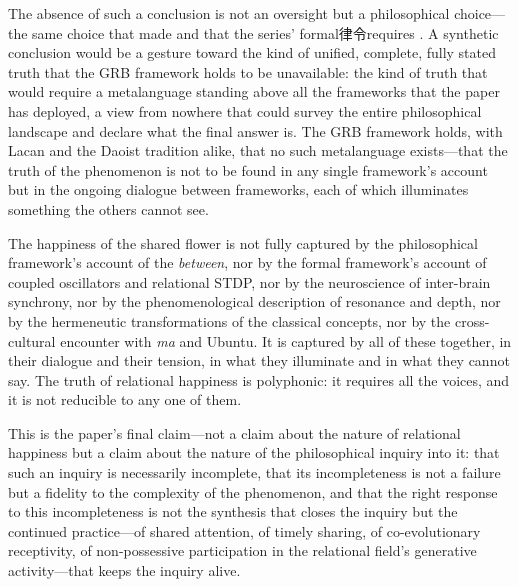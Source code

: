 The absence of such a conclusion is not an oversight but a philosophical choice---the same choice that  made and that the series' formal律令requires \parencite{paperix}. A synthetic conclusion would be a gesture toward the kind of unified, complete, fully stated truth that the GRB framework holds to be unavailable: the kind of truth that would require a metalanguage standing above all the frameworks that the paper has deployed, a view from nowhere that could survey the entire philosophical landscape and declare what the final answer is. The GRB framework holds, with Lacan and the Daoist tradition alike, that no such metalanguage exists---that the truth of the phenomenon is not to be found in any single framework's account but in the ongoing dialogue between frameworks, each of which illuminates something the others cannot see.

The happiness of the shared flower is not fully captured by the philosophical framework's account of the \emph{between}, nor by the formal framework's account of coupled oscillators and relational STDP, nor by the neuroscience of inter-brain synchrony, nor by the phenomenological description of resonance and depth, nor by the hermeneutic transformations of the classical concepts, nor by the cross-cultural encounter with \emph{ma} and Ubuntu. It is captured by all of these together, in their dialogue and their tension, in what they illuminate and in what they cannot say. The truth of relational happiness is polyphonic: it requires all the voices, and it is not reducible to any one of them.

This is the paper's final claim---not a claim about the nature of relational happiness but a claim about the nature of the philosophical inquiry into it: that such an inquiry is necessarily incomplete, that its incompleteness is not a failure but a fidelity to the complexity of the phenomenon, and that the right response to this incompleteness is not the synthesis that closes the inquiry but the continued practice---of shared attention, of timely sharing, of co-evolutionary receptivity, of non-possessive participation in the relational field's generative activity---that keeps the inquiry alive.
